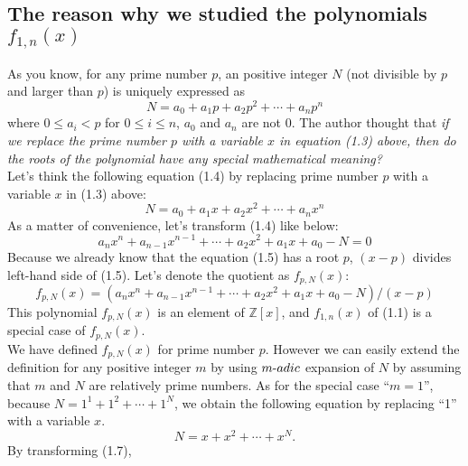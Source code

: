\documentclass{article}
\begin{document}
\subsection{The reason why we studied the polynomials $f_{1,n}(x)$}
As you know, for any prime number $p$, an positive integer $N$ (not divisible by $p$ and larger than $p$) is uniquely expressed as
\begin{equation}
N=a_{0}+a_{1}p+a_{2}p^{2}+\cdots+a_{n}p^{n}
\end{equation}
where $0\leq a_{i}< p$ for $0\leq i\leq n$, $a_{0}$ and $a_{n}$ are not 0. The author thought that {\it if we replace the prime number $p$ with a variable $x$ in equation (1.3) above, then do the roots of the polynomial have any special mathematical meaning?}\\

Let's think the following equation (1.4) by replacing prime number $p$ with a variable $x$ in (1.3) above:
\begin{equation}
N=a_{0}+a_{1}x+a_{2}x^{2}+\cdots+a_{n}x^{n}
\end{equation}
As a matter of convenience, let's transform (1.4) like below:
\begin{equation}
a_{n}x^{n}+a_{n-1}x^{n-1}+\cdots +a_{2}x^{2}+a_{1}x+a_{0}-N=0
\end{equation}
Because we already know that the equation (1.5) has a root $p$, $(x-p)$ divides left-hand side of (1.5). Let's denote the quotient as $f_{p,N}(x)$:
\begin{equation}
f_{p,N}(x)=(a_{n}x^{n}+a_{n-1}x^{n-1}+\cdots +a_{2}x^{2}+a_{1}x+a_{0}-N)/(x-p)
\end{equation}
This polynomial $f_{p,N}(x)$ is an element of $\mathbb{Z}[x]$, and $f_{1,n}(x)$ of (1.1) is a special case of $f_{p,N}(x)$.
\\

We have defined $f_{p,N}(x)$ for prime number $p$. However we can easily extend the definition for any positive integer $m$ by using $m\mathchar`-adic$ expansion of $N$ by assuming that $m$ and $N$ are relatively prime numbers. As for the special case ``$m=1$'', because $N=1^{1}+1^{2}+\cdots+1^{N}$, we obtain the following equation by replacing ``1'' with a variable $x$.
\begin{equation}
N=x+x^{2}+\cdots+x^{N}.
\end{equation}
By transforming (1.7),
\\
\end{document}
